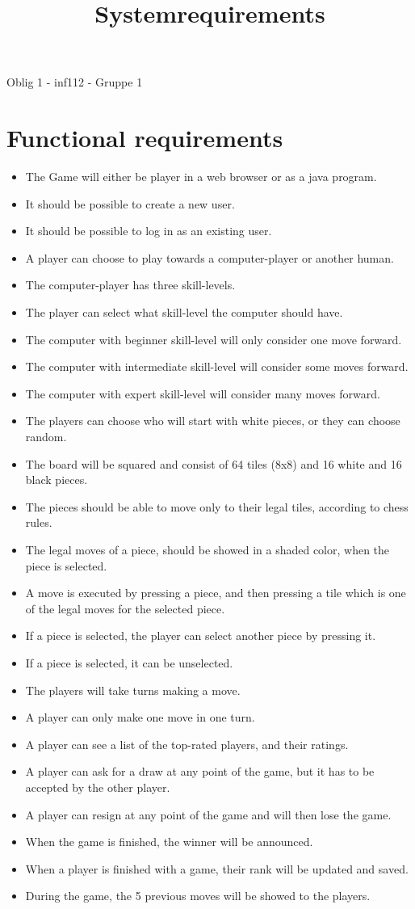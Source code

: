 \documentclass[norsk]{article}
\title{Systemrequirements}
\begin{document}
	\maketitle
Oblig 1 - inf112 - Gruppe 1
\section{Functional requirements}
\begin{itemize}
	\item 
	The Game will either be player in a web browser or as a java program.
	\item 
	It should be possible to create a new user.
	\item 
	It should be possible to log in as an existing user.
	\item 
	A player can choose to play towards a computer-player or another human.
	\item 
	The computer-player has three skill-levels.
	\item 
	The player can select what skill-level the computer should have. 
	\item 
	The computer with beginner skill-level will only consider one move forward.
	\item 
	The computer with intermediate skill-level will consider some moves forward.
	\item 
	The computer with expert skill-level will consider many moves forward.
	\item 
	The players can choose who will start with white pieces, or they can choose random.
	\item
	The board will be squared and consist of 64 tiles (8x8) and 16 white and 16 black pieces.
	\item 
	The pieces should be able to move only to their legal tiles, according to chess rules.
	\item 
	The legal moves of a piece, should be showed in a shaded color, when the piece is selected. 
	\item 
	A move is executed by pressing a piece, and then pressing a tile which is one of the legal moves for the selected piece.  
	\item 
	If a piece is selected, the player can select another piece by pressing it.
	\item
	If a piece is selected, it can be unselected.
	\item 
	The players will take turns making a move.
	\item 
	A player can only make one move in one turn. 
	\item 
	A player can see a list of the top-rated players, and their ratings.
	\item 
	A player can ask for a draw at any point of the game, but it has to be accepted by the other player.
	\item 
	A player can resign at any point of the game and will then lose the game. 
	\item
	When the game is finished, the winner will be announced.
	\item 
	When a player is finished with a game, their rank will be updated and saved.
	\item During the game, the 5 previous moves will be showed to the players.
	

\end{itemize}
\end{document}
